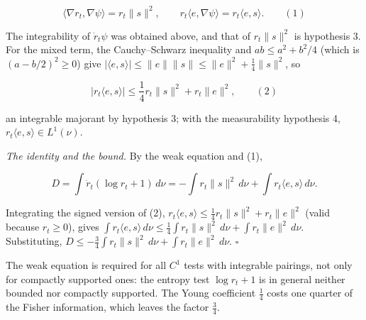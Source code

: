 \documentclass[11pt,a4paper]{report}
\begin{document}
\[\langle\nabla r_t,\nabla\psi\rangle=r_t\|s\|^2,\qquad r_t\langle e,\nabla\psi\rangle=r_t\langle e,s\rangle.\qquad(1)\]


The integrability of \(\dot r_t\psi\) was obtained above, and that of \(r_t\|s\|^2\) is hypothesis 3. For the mixed term, the Cauchy–Schwarz inequality and \(ab\le a^2+b^2/4\) (which is \((a-b/2)^2\ge0\)) give \(|\langle e,s\rangle|\le\|e\|\|s\|\le\|e\|^2+\frac14\|s\|^2\), so


\[\bigl|r_t\langle e,s\rangle\bigr|\le\frac14r_t\|s\|^2+r_t\|e\|^2,\qquad(2)\]


an integrable majorant by hypothesis 3; with the measurability hypothesis 4, \(r_t\langle e,s\rangle\in L^1(\nu)\).




\emph{The identity and the bound.} By the weak equation and (1),


\[D=\int\dot r_t(\log r_t+1)\,d\nu=-\int r_t\|s\|^2\,d\nu+\int r_t\langle e,s\rangle\,d\nu.\]


Integrating the signed version of (2), \(r_t\langle e,s\rangle\le\frac14r_t\|s\|^2+r_t\|e\|^2\) (valid because \(r_t\ge0\)), gives \(\int r_t\langle e,s\rangle\,d\nu\le\frac14\int r_t\|s\|^2\,d\nu+\int r_t\|e\|^2\,d\nu\). Substituting, \(D\le-\frac34\int r_t\|s\|^2\,d\nu+\int r_t\|e\|^2\,d\nu\). \(\square\)




The weak equation is required for all \(C^1\) tests with integrable pairings, not only for compactly supported ones: the entropy test \(\log r_t+1\) is in general neither bounded nor compactly supported. The Young coefficient \(\frac14\) costs one quarter of the Fisher information, which leaves the factor \(\frac34\).
\end{document}
